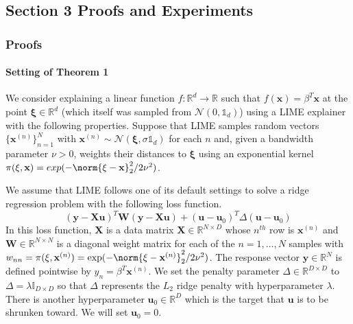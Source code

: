 
\subsection{Section 3 Proofs and Experiments}
    \subsubsection{Proofs}


    \paragraph{Setting of Theorem 1}
        We consider explaining a linear function $f:\mathbb{R}^d \rightarrow \mathbb{R}$ such that $f(\mathbf{x}) = \beta^T \mathbf{x}$ at the point $\mathbf{\xi}\in \mathbb{R}^d$ (which itself was sampled from $\mathcal{N}(0, \mathds{1}_d)$) using a LIME explainer with the following properties. Suppose that LIME samples random vectors $\{\mathbf{x}^{(n)}\}_{n=1}^N$ with $\mathbf{x}^{(n)} \sim \mathcal{N}(\mathbf{\xi},\sigma \mathds{1}_d)$ for each $n$ and, given a bandwidth parameter $\nu > 0$, weights their distances to $\mathbf{\xi}$ using an exponential kernel $\pi(\xi,\mathbf{x}) = exp(-\norm{\mathbf{\xi} - \mathbf{x}}_2^2/2\nu^2)$. 
        
        We assume that LIME follows one of its default settings to solve a ridge regression problem with the following loss function.
        \begin{equation*}
            (\mathbf{y} - \mathbf{X}\mathbf{u})^T \mathbf{W}(\mathbf{y} - \mathbf{X}\mathbf{u}) + (\mathbf{u} - \mathbf{u}_0)^T \Delta(\mathbf{u} - \mathbf{u}_0)
        \end{equation*}
        In this loss function, $\mathbf{X}$ is a data matrix $\mathbf{X} \in \mathbb{R}^{N\times D}$ whose $n^{th}$ row is $\mathbf{x}^{(n)}$ and $\mathbf{W} \in \mathbb{R}^{N\times N}$ is a diagonal weight matrix for each of the $n=1,\ldots,N$ samples with $w_{nn} = \pi(\xi,\mathbf{x}^{(n)}) = \exp(-\norm{\xi - \mathbf{x}^{(n)}}_2^2/2\nu^2)$. The response vector $\mathbf{y}\in \mathbb{R}^N$ is defined pointwise by $y_n = \beta^T \mathbf{x}^{(n)}$. We set the penalty parameter $\Delta\in \mathbb{R}^{D\times D}$ to $\Delta = \lambda \mathds{I}_{D\times D}$ so that $\Delta$ represents the $L_2$ ridge penalty with hyperparameter $\lambda$. There is another hyperparameter $\mathbf{u}_0 \in \mathbb{R}^D$ which is the target that $\mathbf{u}$ is to be shrunken toward.  We will set $\mathbf{u}_0 = 0$.

